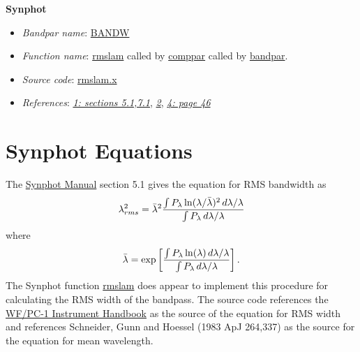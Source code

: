 \documentclass[letterpaper,10pt,english]{sphinxtsr}
\begin{document}
\textbf{Synphot}
\begin{itemize}
\item {} 
\emph{Bandpar name}: \href{https://svn.stsci.edu/trac/ssb/stsci\_python/browser/stsdas/trunk/stsdas/pkg/hst\_calib/synphot/doc/bandpar.hlp}{BANDW}

\item {} 
\emph{Function name}: \href{https://svn.stsci.edu/trac/ssb/stsci\_python/browser/stsdas/trunk/stsdas/lib/synphot/rmslam.x}{rmslam} called by \href{https://svn.stsci.edu/trac/ssb/stsci\_python/browser/stsdas/trunk/stsdas/pkg/hst\_calib/synphot/bandpar/comppar.x}{comppar} called by \href{https://svn.stsci.edu/trac/ssb/stsci\_python/browser/stsdas/trunk/stsdas/pkg/hst\_calib/synphot/bandpar/bandpar.x}{bandpar}.

\item {} 
\emph{Source code}: \href{https://svn.stsci.edu/trac/ssb/stsci\_python/browser/stsdas/trunk/stsdas/lib/synphot/rmslam.x}{rmslam.x}

\item {} 
\emph{References}: {\hyperref[references:ref1]{\emph{1: sections 5.1,7.1}}}, {\hyperref[references:ref2]{\emph{2}}},
{\hyperref[references:ref4]{\emph{4: page 46}}}

\end{itemize}


\section{Synphot Equations}
\label{main:synphot-equations}\label{main:bandpar}
The \href{http://stsdas.stsci.edu/stsci\_python\_epydoc/SynphotManual.pdf}{Synphot Manual} section 5.1 gives the equation for RMS bandwidth as
\begin{gather}
\begin{split}\lambda_{rms}^2 = \bar{\lambda}^2 \frac{\int P_{\lambda} \ln(\lambda/\bar{\lambda})^2
\,d\lambda/\lambda}{\int P_{\lambda} \,d\lambda/\lambda}\end{split}\notag
\end{gather}
where
\begin{gather}
\begin{split}\bar{\lambda} = \exp \left[ \frac{\int P_{\lambda} \ln(\lambda) \,d\lambda/\lambda}
{\int P_{\lambda} \,d\lambda/\lambda} \right].\end{split}\notag
\end{gather}
The Synphot function \href{https://svn.stsci.edu/trac/ssb/stsci\_python/browser/stsdas/trunk/stsdas/lib/synphot/rmslam.x}{rmslam} does appear to implement this procedure for
calculating the RMS width of the bandpass. The source code references the
\href{http://www.stsci.edu/hst/wfpc/documents/HST\_WFPC\_Instrument\_Handbook.pdf}{WF/PC-1 Instrument Handbook}
as the source of the equation for RMS width and references
Schneider, Gunn and Hoessel (1983 ApJ 264,337) as the source for the equation
for mean wavelength.
\end{document}
